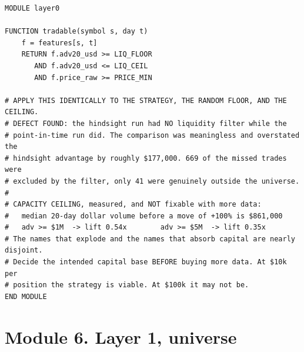 \documentclass[10pt]{article}
\begin{document}
\begin{lstlisting}
MODULE layer0

FUNCTION tradable(symbol s, day t)
    f = features[s, t]
    RETURN f.adv20_usd >= LIQ_FLOOR
       AND f.adv20_usd <= LIQ_CEIL
       AND f.price_raw >= PRICE_MIN

# APPLY THIS IDENTICALLY TO THE STRATEGY, THE RANDOM FLOOR, AND THE CEILING.
# DEFECT FOUND: the hindsight run had NO liquidity filter while the
# point-in-time run did. The comparison was meaningless and overstated the
# hindsight advantage by roughly $177,000. 669 of the missed trades were
# excluded by the filter, only 41 were genuinely outside the universe.
#
# CAPACITY CEILING, measured, and NOT fixable with more data:
#   median 20-day dollar volume before a move of +100% is $861,000
#   adv >= $1M  -> lift 0.54x        adv >= $5M  -> lift 0.35x
# The names that explode and the names that absorb capital are nearly disjoint.
# Decide the intended capital base BEFORE buying more data. At $10k per
# position the strategy is viable. At $100k it may not be.
END MODULE
\end{lstlisting}

\section{Module 6. Layer 1, universe}
\end{document}
